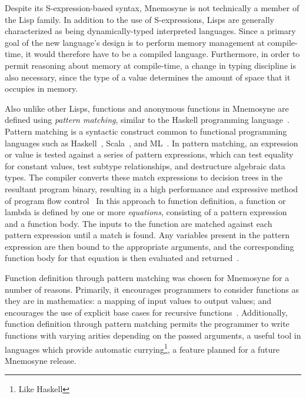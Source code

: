 \documentclass[11pt,a4paper]{article}
\theoremstyle{break}
\begin{document}
Despite its S-expression-based syntax, Mnemosyne is not technically a member of the Lisp family. In addition to the use of S-expressions, Lisps are generally characterized as being dynamically-typed interpreted languages. Since a primary goal of the new language's design is to perform memory management at compile-time, it would therefore have to be a compiled language. Furthermore, in order to permit reasoning about memory at compile-time, a change in typing discipline is also necessary, since the type of a value determines the amount of space that it occupies in memory.

Also unlike other Lisps, functions and anonymous functions in Mnemosyne are defined using \textit{pattern matching}, similar to the Haskell programming language~\cite{jones2003haskell,hudak1992gentle,hudak1992report}. Pattern matching is a syntactic construct common to functional programming languages such as Haskell~\cite{jones2003haskell,hudak1992report,hudak1992gentle}, Scala~\cite{odersky2004scala,odersky2004overview}, and ML~\cite{maranget2008compiling,Krishnaswami:2009:FPM:1594834.1480927}. In pattern matching, an expression or value is tested against a series of pattern expressions, which can test equality for constant values, test subtype relationships, and destructure algebraic data types. The compiler converts these match expressions to decision trees in the resultant program binary, resulting in a high performance and expressive method of program flow control~\cite{maranget2007warnings,Krishnaswami:2009:FPM:1594834.1480927,syme2007extensible,maranget2008compiling} In this approach to function definition, a function or lambda is defined by one or more \textit{equations}, consisting of a pattern expression and a function body. The inputs to the function are matched against each pattern expression until a match is found. Any variables present in the pattern expression are then bound to the appropriate arguments, and the corresponding function body for that equation is then evaluated and returned~\cite{jones2003haskell,hudak1992report}.

Function definition through pattern matching was chosen for Mnemosyne for a number of reasons. Primarily, it encourages programmers to consider functions as they are in mathematics: a mapping of input values to output values; and encourages the use of explicit base cases for recursive functions~\cite{hudak1992gentle}. Additionally, function definition through pattern matching permits the programmer to write functions with varying arities depending on the passed arguments, a useful tool in languages which provide automatic currying\footnote{Like Haskell}, a feature planned for a future Mnemosyne release.
\end{document}

